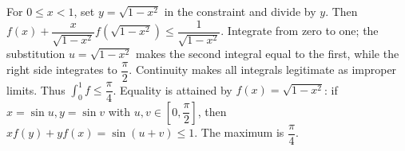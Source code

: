 For $0\le x<1$, set $y=\sqrt{1-x^2}$ in the constraint and divide by $y$. Then $f(x)+\dfrac{x}{\sqrt{1-x^2}}f(\sqrt{1-x^2})\le\dfrac{1}{\sqrt{1-x^2}}$. Integrate from zero to one; the substitution $u=\sqrt{1-x^2}$ makes the second integral equal to the first, while the right side integrates to $\dfrac{\pi}{2}$. Continuity makes all integrals legitimate as improper limits. Thus $\int_0^1f\le\dfrac{\pi}{4}$. Equality is attained by $f(x)=\sqrt{1-x^2}$: if $x=\sin u,y=\sin v$ with $u , v \in [0 , \dfrac{\pi}{2}]$, then $xf(y)+yf(x)=\sin(u+v)\le1$. The maximum is $\boxed{\dfrac{\pi}{4}}$.
